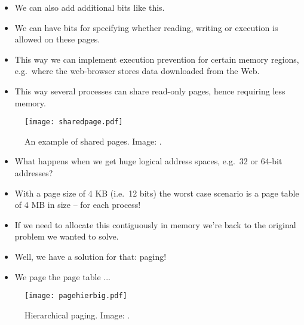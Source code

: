 \documentclass{beamer}
\begin{document}
\begin{frame}{\insertsubsectionhead}
  \begin{itemize}
    \item We can also add additional bits like this.

    \item We can have bits for specifying whether reading, writing or execution 
      is allowed on these pages.

    \item This way we can implement execution prevention for certain memory 
      regions, e.g.\ where the web-browser stores data downloaded from the Web.

    \item This way several processes can share read-only pages, hence requiring 
      less memory.

  \end{itemize}
\end{frame}

\begin{frame}{\insertsubsectionhead}
  \begin{figure}
    \texttt{[image: sharedpage.pdf]}
    \caption{An example of shared pages.
      Image: \cite{Silberschatz2013osc}.}
  \end{figure}
\end{frame}

\begin{frame}{\insertsubsectionhead}
  \begin{itemize}
    \item What happens when we get huge logical address spaces, e.g.\ 32 or 
      64-bit addresses?

    \item With a page size of 4 KB (i.e.\ 12 bits) the worst case scenario is 
      a page table of 4 MB in size -- for each process!

    \item If we need to allocate this contiguously in memory we're back to the 
      original problem we wanted to solve.

    \item Well, we have a solution for that: paging!

    \item We page the page table ...

  \end{itemize}
\end{frame}

\begin{frame}{\insertsubsectionhead}
  \begin{figure}
    \texttt{[image: pagehierbig.pdf]}
    \caption{Hierarchical paging.
      Image: \cite{Silberschatz2013osc}.}
  \end{figure}
\end{frame}
\end{document}
